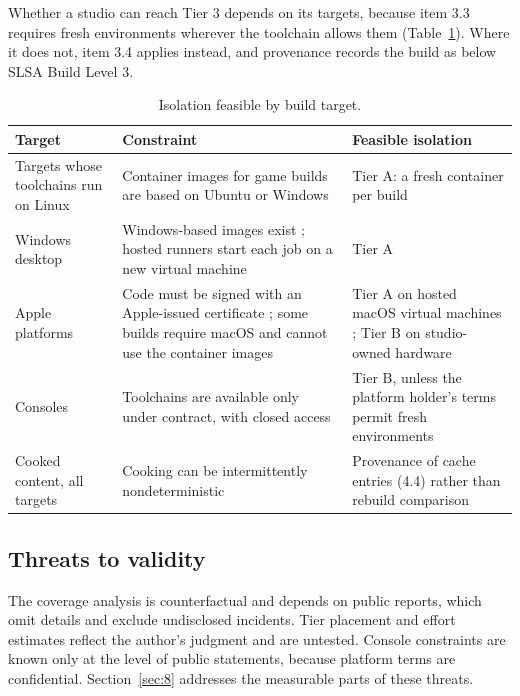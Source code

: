 \documentclass[acmsmall,screen,review]{acmart}
\begin{document}
Whether a studio can reach Tier 3 depends on its targets, because item 3.3 requires fresh environments wherever the toolchain allows them (Table~\ref{tab:9}). Where it does not, item 3.4 applies instead, and provenance records the build as below SLSA Build Level 3.

\begin{table}[htbp]
\caption{Isolation feasible by build target.}
\label{tab:9}
\small
\begin{tabularx}{\linewidth}{@{}>{\hsize=0.474\hsize\raggedright\arraybackslash}X>{\hsize=1.476\hsize\raggedright\arraybackslash}X>{\hsize=1.050\hsize\raggedright\arraybackslash}X@{}}
\toprule
\textbf{Target} & \textbf{Constraint} & \textbf{Feasible isolation} \\
\midrule
Targets whose toolchains run on Linux & Container images for game builds are based on Ubuntu or Windows \cite{gamecinddocker} & Tier A: a fresh container per build \\
Windows desktop & Windows-based images exist \cite{gamecinddocker}; hosted runners start each job on a new virtual machine \cite{githubndgithub} & Tier A \\
Apple platforms & Code must be signed with an Apple-issued certificate \cite{applendapp}; some builds require macOS and cannot use the container images \cite{gamecinddocker} & Tier A on hosted macOS virtual machines \cite{githubndgithub}; Tier B on studio-owned hardware \\
Consoles & Toolchains are available only under contract, with closed access \cite{godotndconsole} & Tier B, unless the platform holder's terms permit fresh environments \\
Cooked content, all targets & Cooking can be intermittently nondeterministic \cite{epicndc} & Provenance of cache entries (4.4) rather than rebuild comparison \\
\bottomrule
\end{tabularx}
\end{table}


\subsection{Threats to validity}\label{sec:7.4}

The coverage analysis is counterfactual and depends on public reports, which omit details and exclude undisclosed incidents. Tier placement and effort estimates reflect the author's judgment and are untested. Console constraints are known only at the level of public statements, because platform terms are confidential. Section~\ref{sec:8} addresses the measurable parts of these threats.
\end{document}
